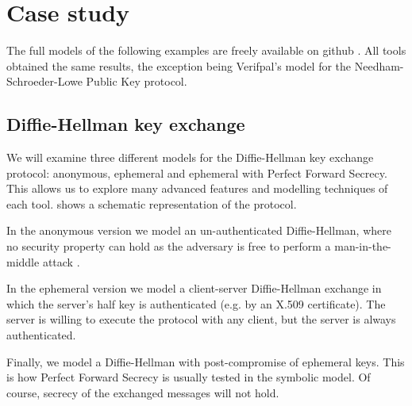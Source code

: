 
\section{Case study}
\label{section:case-study}

The full models of the following examples are freely available on github \cite{CaseStudies}. All tools obtained the same results, the exception being Verifpal's model for the Needham-Schroeder-Lowe Public Key protocol.

\subsection{Diffie-Hellman key exchange}

We will examine three different models for the Diffie-Hellman key exchange protocol: anonymous, ephemeral and ephemeral with Perfect Forward Secrecy. This allows us to explore many advanced features and modelling techniques of each tool.  shows a schematic representation of the protocol.

In the anonymous version we model an un-authenticated Diffie-Hellman, where no security property can hold as the adversary is free to perform a man-in-the-middle attack \cite{MITM-DH}.

In the ephemeral version we model a client-server Diffie-Hellman exchange in which the server's half key is authenticated (e.g. by an X.509 certificate). The server is willing to execute the protocol with any client, but the server is always authenticated.

Finally, we model a Diffie-Hellman with post-compromise of ephemeral keys. This is how Perfect Forward Secrecy \cite{PFS} is usually tested in the symbolic model. Of course, secrecy of the exchanged messages will not hold.

